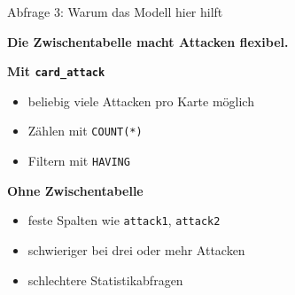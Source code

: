 \documentclass[aspectratio=169,11pt]{beamer}
\begin{document}
\begin{frame}{Abfrage 3: Warum das Modell hier hilft}
  \begin{panel}[colback=softgold,colframe=gold!45]
    {\Large\bfseries Die Zwischentabelle macht Attacken flexibel.}
  \end{panel}
  \vspace{0.35cm}
  \begin{minipage}[t]{0.48\textwidth}
    \begin{panel}
      {\bfseries Mit \texttt{card\_attack}}\par
      \begin{itemize}
        \item beliebig viele Attacken pro Karte m\"oglich
        \item Z\"ahlen mit \texttt{COUNT(*)}
        \item Filtern mit \texttt{HAVING}
      \end{itemize}
    \end{panel}
  \end{minipage}\hfill
  \begin{minipage}[t]{0.48\textwidth}
    \begin{panel}
      {\bfseries Ohne Zwischentabelle}\par
      \begin{itemize}
        \item feste Spalten wie \texttt{attack1}, \texttt{attack2}
        \item schwieriger bei drei oder mehr Attacken
        \item schlechtere Statistikabfragen
      \end{itemize}
    \end{panel}
  \end{minipage}
\end{frame}
\end{document}
